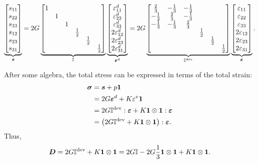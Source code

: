 \begin{gather}\label{eq:dev_tensor_se}
\underbrace{\begin{bmatrix}
s_{11}\\
s_{22}\\
s_{33}\\
s_{12}\\
s_{23}\\
s_{31}
\end{bmatrix}}_{\bm{s}}
=
2G\underbrace{\begin{bmatrix}
1&&&&&\\
&1&&&&\\
&&1&&&\\
&&&\frac{1}{2}&&\\
&&&&\frac{1}{2}&\\
&&&&&\frac{1}{2}
\end{bmatrix}}_{\mathbb{I}}
\underbrace{\begin{bmatrix}
\varepsilon^d_{11}\\
\varepsilon^d_{22}\\
\varepsilon^d_{33}\\
2\varepsilon^d_{12}\\
2\varepsilon^d_{23}\\
2\varepsilon^d_{31}
\end{bmatrix}}_{\bm{\varepsilon}^d}
=
2G\underbrace{\begin{bmatrix}
\frac{2}{3}&-\frac{1}{3}&-\frac{1}{3}&&&\\
-\frac{1}{3}&\frac{2}{3}&-\frac{1}{3}&&&\\
-\frac{1}{3}&-\frac{1}{3}&\frac{2}{3}&&&\\
&&&\frac{1}{2}&&\\
&&&&\frac{1}{2}&\\
&&&&&\frac{1}{2}
\end{bmatrix}}_{\mathbb{I^\text{dev}}}
\underbrace{\begin{bmatrix}
\varepsilon_{11}\\
\varepsilon_{22}\\
\varepsilon_{33}\\
2\varepsilon_{12}\\
2\varepsilon_{23}\\
2\varepsilon_{31}
\end{bmatrix}}_{\bm{\varepsilon}}.
\end{gather}

After some algebra, the total stress can be expressed in terms of the total strain:
\begin{gather}
\begin{split}
\bm{\sigma}&=\bm{s}+p\bm{1}\\
&=2G\bm{\varepsilon}^d+K\varepsilon^v\bm{1}\\
&=2G\mathbb{I}^\text{dev}:\bm{\varepsilon}+K\bm{1}\otimes\bm{1}:\bm{\varepsilon}\\
&=\left(2G\mathbb{I}^\text{dev}+K\bm{1}\otimes\bm{1}\right):\bm{\varepsilon}.
\end{split}
\end{gather}
Thus,
\begin{gather}
\bm{D}=2G\mathbb{I}^\text{dev}+K\bm{1}\otimes\bm{1}=2G\mathbb{I}-2G\dfrac{1}{3}\bm{1}\otimes\bm{1}+K\bm{1}\otimes\bm{1}.
\end{gather}

